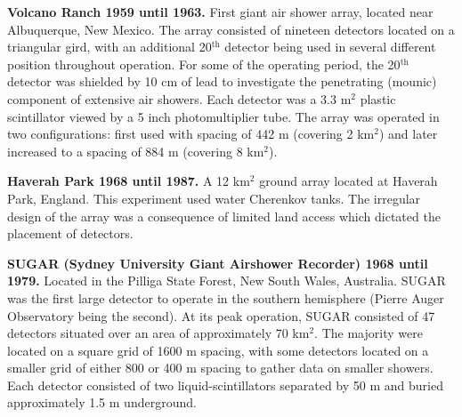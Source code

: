 %
%
%
%
%
%
%

\textbf{Volcano Ranch 1959 until 1963.} First giant air shower array, located near Albuquerque, New Mexico. The array consisted of nineteen detectors located on a triangular gird, with an additional 20$^{\text{th}}$ detector being used in several different position throughout operation. For some of the operating period, the 20$^{\text{th}}$ detector was shielded by 10 cm of lead to investigate the penetrating (mounic) component of extensive air showers. Each detector was a 3.3 m$^2$ plastic scintillator viewed by a 5 inch photomultiplier tube. The array was operated in two configurations: first used with spacing of 442 m (covering 2 km$^2$) and later increased to a spacing of 884 m (covering 8 km$^2$). 

\noindent \textbf{Haverah Park 1968 until 1987.} A 12 km$^2$ ground array located at Haverah Park, England. This experiment used water Cherenkov tanks. The irregular design of the array was a consequence of limited land access which dictated the placement of detectors.
					
\noindent \textbf{SUGAR (Sydney University Giant Airshower Recorder) 1968 until 1979.} Located in the Pilliga State Forest, New South Wales, Australia. SUGAR was the first large detector to operate in the southern hemisphere (Pierre Auger Observatory being the second). At its peak operation, SUGAR consisted of 47 detectors situated over an area of approximately 70 km$^2$. The majority were located on a square grid of 1600 m spacing, with some detectors located on a smaller grid of either 800 or 400 m spacing to gather data on smaller showers. Each detector consisted of two liquid-scintillators separated by 50 m and buried approximately 1.5 m underground. 
					
